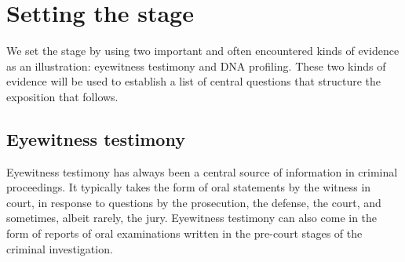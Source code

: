 \documentclass[10pt]{article}
\begin{document}
\section{Setting the stage}

We set the stage by using two important and often encountered kinds of evidence as an illustration: eyewitness testimony and DNA profiling. 
These two kinds of evidence will be used to establish a list of central questions that structure the exposition that follows.

\subsection{Eyewitness testimony}

Eyewitness testimony has always been a central source of information in criminal proceedings. It typically takes the form of 
oral statements by the witness in court, in response to questions by the prosecution, the defense, the court, and sometimes, albeit rarely, the jury. 
Eyewitness testimony can also come in the form of reports of oral 
examinations written in the pre-court stages of the criminal investigation. %
\end{document}

